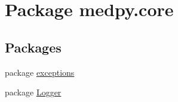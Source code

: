 \hypertarget{namespacemedpy_1_1core}{
\section{Package medpy.core}
\label{namespacemedpy_1_1core}
}
\subsection*{Packages}
\begin{DoxyCompactItemize}
\item 
package \hyperlink{namespacemedpy_1_1core_1_1exceptions}{exceptions}
\item 
package \hyperlink{namespacemedpy_1_1core_1_1Logger}{Logger}
\end{DoxyCompactItemize}
